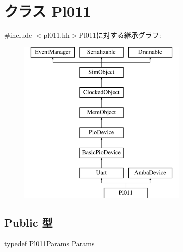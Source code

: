 \hypertarget{classPl011}{
\section{クラス Pl011}
\label{classPl011}
}


{\ttfamily \#include $<$pl011.hh$>$}Pl011に対する継承グラフ:\begin{figure}[H]
\begin{center}
\leavevmode
\includegraphics[height=8cm]{classPl011}
\end{center}
\end{figure}
\subsection*{Public 型}
\begin{DoxyCompactItemize}
\item 
typedef Pl011Params \hyperlink{classPl011_a7c50120eadc91b7f8522e0e4f1398769}{Params}
\end{DoxyCompactItemize}
